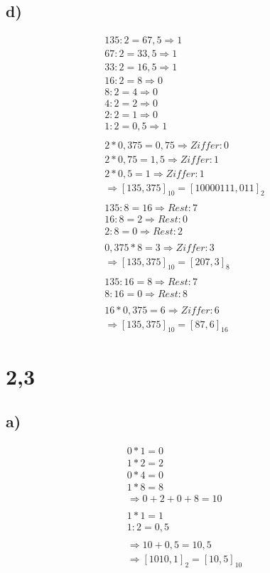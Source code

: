 \documentclass[12pt,a4paper]{article}
\begin{document}
\subsection*{d)}
\begin{align*}
135 : 2 = 67,5 \Rightarrow 1 \\
67 : 2 = 33,5 \Rightarrow 1 \\
33 : 2 = 16,5 \Rightarrow 1 \\
16 : 2 = 8 \Rightarrow 0 \\
8 : 2 = 4 \Rightarrow 0 \\
4 : 2 = 2 \Rightarrow 0 \\
2 : 2 = 1 \Rightarrow 0 \\
1 : 2 = 0,5 \Rightarrow 1 \\
\\
2 * 0,375 = 0,75 \Rightarrow Ziffer: 0 \\
2 * 0,75 = 1,5 \Rightarrow Ziffer: 1 \\
2 * 0,5 = 1 \Rightarrow Ziffer: 1 \\
\Rightarrow [135,375]_{10} = [10000111,011]_{2} \\
\\
135 : 8 = 16 \Rightarrow Rest: 7 \\
16 : 8 = 2 \Rightarrow Rest: 0 \\
2 : 8 = 0 \Rightarrow Rest: 2 \\
\\
0,375 * 8 = 3 \Rightarrow Ziffer: 3 \\
\Rightarrow [135,375]_{10} = [207,3]_{8} \\
\\
135 : 16 = 8 \Rightarrow Rest: 7 \\
8 : 16 = 0 \Rightarrow Rest: 8 \\
\\
16 * 0,375 = 6 \Rightarrow Ziffer: 6 \\
\Rightarrow [135,375]_{10} = [87,6]_{16}
\end{align*}

\section*{2,3}
\subsection*{a)}
\begin{align*}
0 * 1 = 0 \\
1 * 2 = 2 \\
0 * 4 = 0 \\
1 * 8 = 8 \\
\Rightarrow 0 + 2 + 0 + 8 = 10 \\
\\
1 * 1 = 1 \\
1 : 2 = 0,5 \\
\\
\Rightarrow 10 + 0,5 = 10,5 \\
\Rightarrow [1010,1]_{2} = [10,5]_{10}
\end{align*}
\end{document}
